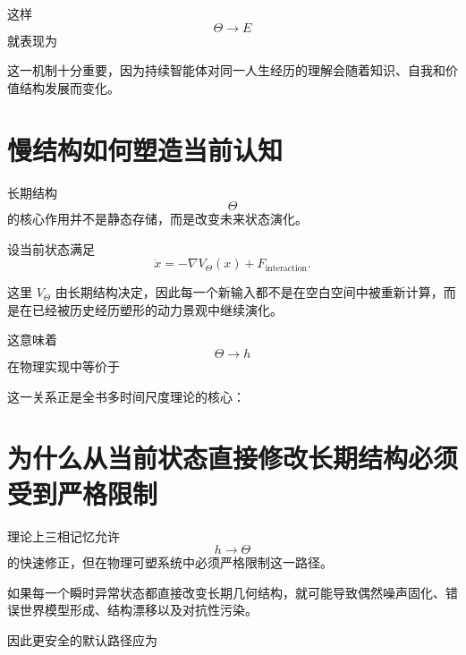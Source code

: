 这样
\[
\Theta\rightarrow E
\]
就表现为
\begin{statementbox}
\centering
{}
\end{statementbox}

这一机制十分重要，因为持续智能体对同一人生经历的理解会随着知识、自我和价值结构发展而变化。

\section{慢结构如何塑造当前认知}

长期结构
\[
\Theta
\]
的核心作用并不是静态存储，而是改变未来状态演化。

设当前状态满足
\[
\dot x
=
-\nabla V_\Theta(x)
+
F_{\mathrm{interaction}}.
\]

这里 $V_\Theta$ 由长期结构决定，因此每一个新输入都不是在空白空间中被重新计算，而是在已经被历史经历塑形的动力景观中继续演化。

这意味着
\[
\Theta\rightarrow h
\]
在物理实现中等价于
\begin{statementbox}
\centering
{}
\end{statementbox}

这一关系正是全书多时间尺度理论的核心：
\begin{statementbox}
\centering
{}
\end{statementbox}

\section{为什么从当前状态直接修改长期结构必须受到严格限制}

理论上三相记忆允许
\[
h\rightarrow\Theta
\]
的快速修正，但在物理可塑系统中必须严格限制这一路径。

如果每一个瞬时异常状态都直接改变长期几何结构，就可能导致偶然噪声固化、错误世界模型形成、结构漂移以及对抗性污染。

因此更安全的默认路径应为
\begin{statementbox}
\centering
{}
\end{statementbox}

